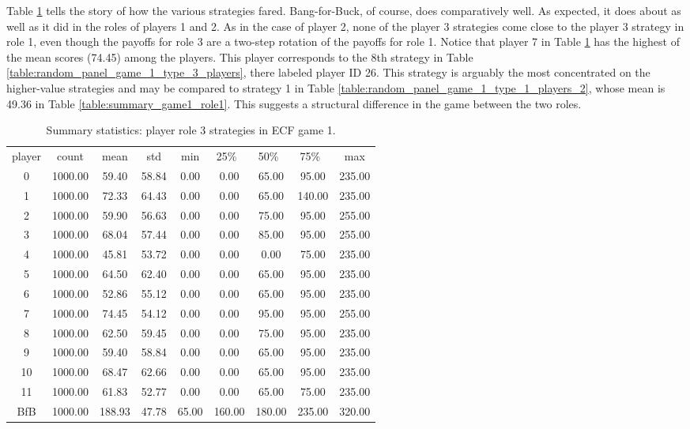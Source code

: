 \documentclass[11pt, oneside]{article}   	%
\begin{document}
\clearpage\newpage
Table \ref{table:summary_game1_role3} tells the story of how the various strategies fared. Bang-for-Buck, of course, does comparatively well. As expected, it does about as well as it did in the roles of players 1 and 2. As in the case of player 2, none of the player 3 strategies come close to the player 3 strategy in role 1, even though the payoffs for role 3 are a two-step rotation of the  payoffs for role 1. Notice that player 7 in Table \ref{table:summary_game1_role3}  has the highest of the mean scores (74.45) among the players. This player corresponds to the 8th strategy in Table \ref{table:random_panel_game_1_type_3_players}, there labeled player ID 26. This strategy is arguably the most concentrated on the higher-value strategies and may be compared to 
strategy 1 in Table \ref{table:random_panel_game_1_type_1_players_2},  whose mean is 49.36 in Table \ref{table:summary_game1_role1}. This suggests a structural difference in the game between the two roles.

\begin{table}[h]
\figtop

\centering
\begin{tabular}{ccccccccc}
 player & count & mean & std & min & 25\%\ & 50\%\ & 75\%\ & max \\ 
0 & 1000.00 & 59.40 & 58.84 & 0.00 & 0.00 & 65.00 & 95.00 & 235.00 \\ 
1 & 1000.00 & 72.33 & 64.43 & 0.00 & 0.00 & 65.00 & 140.00 & 235.00 \\ 
2 & 1000.00 & 59.90 & 56.63 & 0.00 & 0.00 & 75.00 & 95.00 & 255.00 \\ 
3 & 1000.00 & 68.04 & 57.44 & 0.00 & 0.00 & 85.00 & 95.00 & 255.00 \\ 
4 & 1000.00 & 45.81 & 53.72 & 0.00 & 0.00 & 0.00 & 75.00 & 235.00 \\ 
5 & 1000.00 & 64.50 & 62.40 & 0.00 & 0.00 & 65.00 & 95.00 & 235.00 \\ 
6 & 1000.00 & 52.86 & 55.12 & 0.00 & 0.00 & 65.00 & 95.00 & 235.00 \\ 
7 & 1000.00 & 74.45 & 54.12 & 0.00 & 0.00 & 95.00 & 95.00 & 255.00 \\ 
8 & 1000.00 & 62.50 & 59.45 & 0.00 & 0.00 & 75.00 & 95.00 & 235.00 \\ 
9 & 1000.00 & 59.40 & 58.84 & 0.00 & 0.00 & 65.00 & 95.00 & 235.00 \\ 
10 & 1000.00 & 68.47 & 62.66 & 0.00 & 0.00 & 65.00 & 95.00 & 235.00 \\ 
11 & 1000.00 & 61.83 & 52.77 & 0.00 & 0.00 & 65.00 & 75.00 & 235.00 \\ 
BfB & 1000.00 & 188.93 & 47.78 & 65.00 & 160.00 & 180.00 & 235.00 & 320.00 \\ 
 \end{tabular}
\caption{Summary statistics: player role 3 strategies in ECF game 1.}
\label{table:summary_game1_role3}
\figbot
\end{table}
\end{document}
